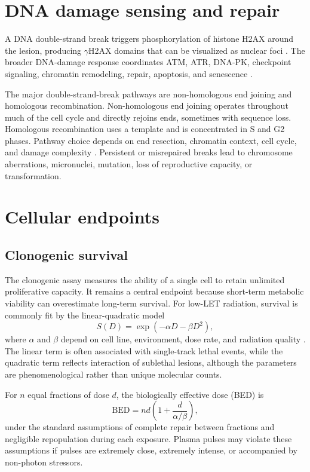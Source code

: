 \section{DNA damage sensing and repair}

A DNA double-strand break triggers phosphorylation of histone H2AX around the lesion, producing $\gamma$H2AX domains that can be visualized as nuclear foci \cite{rogakou1998,lobrich2010}. The broader DNA-damage response coordinates ATM, ATR, DNA-PK, checkpoint signaling, chromatin remodeling, repair, apoptosis, and senescence \cite{jackson2009ddr,ciccia2010}.

The major double-strand-break pathways are non-homologous end joining and homologous recombination. Non-homologous end joining operates throughout much of the cell cycle and directly rejoins ends, sometimes with sequence loss. Homologous recombination uses a template and is concentrated in S and G2 phases. Pathway choice depends on end resection, chromatin context, cell cycle, and damage complexity \cite{chapman2012}. Persistent or misrepaired breaks lead to chromosome aberrations, micronuclei, mutation, loss of reproductive capacity, or transformation.

\section{Cellular endpoints}

\subsection{Clonogenic survival}

The clonogenic assay measures the ability of a single cell to retain unlimited proliferative capacity. It remains a central endpoint because short-term metabolic viability can overestimate long-term survival. For low-LET radiation, survival is commonly fit by the linear-quadratic model
\begin{equation}
S(D)=\exp(-\alpha D-\beta D^2),
\label{eq:lq}
\end{equation}
where $\alpha$ and $\beta$ depend on cell line, environment, dose rate, and radiation quality \cite{douglas1976,fowler1989,brenner1998}. The linear term is often associated with single-track lethal events, while the quadratic term reflects interaction of sublethal lesions, although the parameters are phenomenological rather than unique molecular counts.

For $n$ equal fractions of dose $d$, the biologically effective dose (BED) is
\begin{equation}
\mathrm{BED}=nd\left(1+\frac{d}{\alpha/\beta}\right),
\label{eq:bed}
\end{equation}
under the standard assumptions of complete repair between fractions and negligible repopulation during each exposure. Plasma pulses may violate these assumptions if pulses are extremely close, extremely intense, or accompanied by non-photon stressors.

